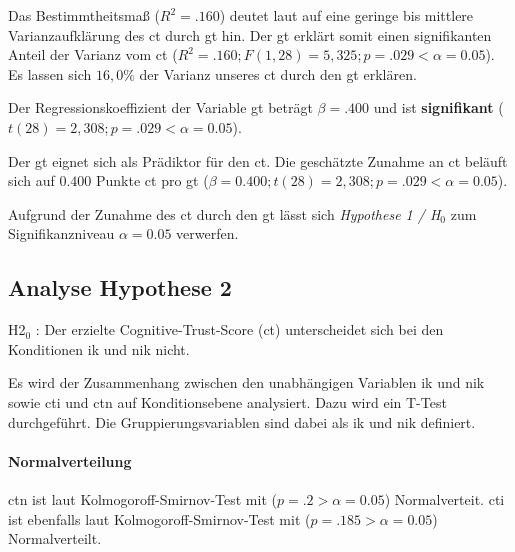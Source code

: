 \documentclass[a4paper,11pt]{article}%
\renewcommand{\\}{\vspace*{0.5\baselineskip} \newline}
\begin{document}

Das Bestimmtheitsmaß ($R^{2} = .160$) deutet laut \citep{cohen2013statistical} auf eine geringe bis mittlere Varianzaufklärung des \ac{ct} durch \ac{gt} hin. Der \ac{gt} erklärt somit einen signifikanten Anteil der Varianz vom \ac{ct} ($R^{2} = .160; F(1,28) = 5,325; p = .029 < \alpha = 0.05$). Es lassen sich $16,0\%$ der Varianz unseres \ac{ct} durch den \ac{gt} erklären.

Der Regressionskoeffizient der Variable \ac{gt} beträgt $\beta = .400$ und ist \textbf{signifikant} ($t(28) = 2,308; p = .029 < \alpha = 0.05$).

Der \ac{gt} eignet sich als Prädiktor für den \ac{ct}. Die geschätzte Zunahme an \ac{ct} beläuft sich auf $0.400$ Punkte \ac{ct} pro \ac{gt} ($\beta = 0.400; t(28) = 2,308; p = .029 < \alpha = 0.05$).

Aufgrund der Zunahme des \ac{ct} durch den \ac{gt} lässt sich \textit{Hypothese 1 / H$_{0}$} zum Signifikanzniveau $\alpha = 0.05$ verwerfen.

\newpage
	\subsection{Analyse Hypothese 2}
H2$_{0}$ : Der erzielte Cognitive-Trust-Score (\ac{ct}) unterscheidet sich bei den Konditionen \ac{ik} und \ac{nik} nicht.

Es wird der Zusammenhang zwischen den unabhängigen Variablen \ac{ik} und \ac{nik} sowie \ac{cti} und \ac{ctn} auf Konditionsebene analysiert. Dazu wird ein T-Test durchgeführt. Die Gruppierungsvariablen sind dabei als \ac{ik} und \ac{nik} definiert.

%
%	
\paragraph{Normalverteilung}
\ac{ctn} ist laut Kolmogoroff-Smirnov-Test mit ($p = .2 > \alpha = 0.05$) Normalverteit. \ac{cti} ist ebenfalls laut Kolmogoroff-Smirnov-Test mit ($p = .185 > \alpha = 0.05$) Normalverteilt. 
\end{document}
